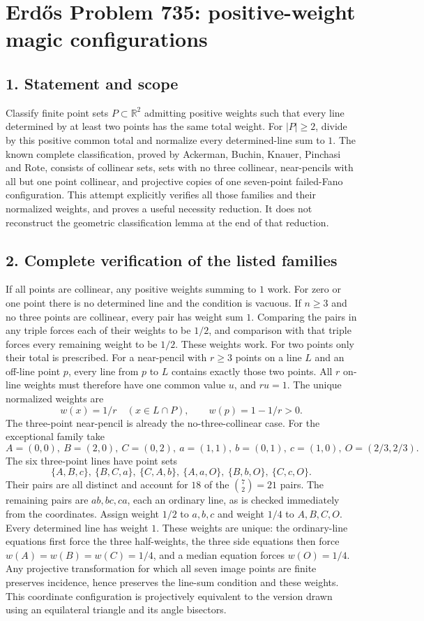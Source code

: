 \section*{Erd\H{o}s Problem 735: positive-weight magic configurations}
\subsection*{1. Statement and scope}
Classify finite point sets $P\subset\mathbb R^2$ admitting positive weights such that every line determined by at least two points has the same total weight. For $|P|\ge2$, divide by this positive common total and normalize every determined-line sum to $1$.
The known complete classification, proved by Ackerman, Buchin, Knauer, Pinchasi and Rote, consists of collinear sets, sets with no three collinear, near-pencils with all but one point collinear, and projective copies of one seven-point failed-Fano configuration. This attempt explicitly verifies all those families and their normalized weights, and proves a useful necessity reduction. It does not reconstruct the geometric classification lemma at the end of that reduction.
\subsection*{2. Complete verification of the listed families}
If all points are collinear, any positive weights summing to $1$ work. For zero or one point there is no determined line and the condition is vacuous.
If $n\ge3$ and no three points are collinear, every pair has weight sum $1$. Comparing the pairs in any triple forces each of their weights to be $1/2$, and comparison with that triple forces every remaining weight to be $1/2$. These weights work. For two points only their total is prescribed.
For a near-pencil with $r\ge3$ points on a line $L$ and an off-line point $p$, every line from $p$ to $L$ contains exactly those two points. All $r$ on-line weights must therefore have one common value $u$, and $ru=1$. The unique normalized weights are
\[
 w(x)=1/r\quad(x\in L\cap P),\qquad w(p)=1-1/r>0.
\]
The three-point near-pencil is already the no-three-collinear case.
For the exceptional family take
\[
 A=(0,0),\ B=(2,0),\ C=(0,2),\
 a=(1,1),\ b=(0,1),\ c=(1,0),\ O=(2/3,2/3).
\]
The six three-point lines have point sets
\[
 \{A,B,c\},\ \{B,C,a\},\ \{C,A,b\},\
 \{A,a,O\},\ \{B,b,O\},\ \{C,c,O\}.
\]
Their pairs are all distinct and account for $18$ of the $\binom72=21$ pairs. The remaining pairs are $ab,bc,ca$, each an ordinary line, as is checked immediately from the coordinates. Assign weight $1/2$ to $a,b,c$ and weight $1/4$ to $A,B,C,O$. Every determined line has weight $1$. These weights are unique: the ordinary-line equations first force the three half-weights, the three side equations then force $w(A)=w(B)=w(C)=1/4$, and a median equation forces $w(O)=1/4$.
Any projective transformation for which all seven image points are finite preserves incidence, hence preserves the line-sum condition and these weights. This coordinate configuration is projectively equivalent to the version drawn using an equilateral triangle and its angle bisectors.
